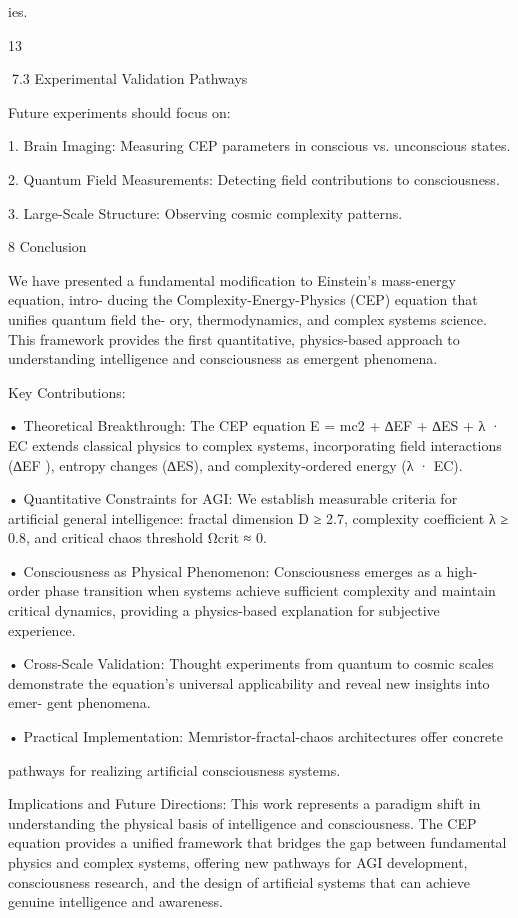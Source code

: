 ies.

13

7.3 Experimental Validation Pathways

Future experiments should focus on:

1. Brain Imaging: Measuring CEP parameters in conscious vs. unconscious states.

2. Quantum Field Measurements: Detecting field contributions to consciousness.

3. Large-Scale Structure: Observing cosmic complexity patterns.

8 Conclusion

We have presented a fundamental modification to Einstein’s mass-energy equation, intro-
ducing the Complexity-Energy-Physics (CEP) equation that unifies quantum field the-
ory, thermodynamics, and complex systems science. This framework provides the first
quantitative, physics-based approach to understanding intelligence and consciousness as
emergent phenomena.

Key Contributions:

• Theoretical Breakthrough: The CEP equation E = mc2 + ∆EF + ∆ES + λ ·
EC extends classical physics to complex systems, incorporating field interactions
(∆EF ), entropy changes (∆ES), and complexity-ordered energy (λ · EC).

• Quantitative Constraints for AGI: We establish measurable criteria for artificial
general intelligence: fractal dimension D ≥ 2.7, complexity coefficient λ ≥ 0.8, and
critical chaos threshold Ωcrit ≈ 0.

• Consciousness as Physical Phenomenon: Consciousness emerges as a high-
order phase transition when systems achieve sufficient complexity and maintain
critical dynamics, providing a physics-based explanation for subjective experience.

• Cross-Scale Validation: Thought experiments from quantum to cosmic scales
demonstrate the equation’s universal applicability and reveal new insights into emer-
gent phenomena.

• Practical Implementation: Memristor-fractal-chaos architectures offer concrete

pathways for realizing artificial consciousness systems.

Implications and Future Directions: This work represents a paradigm shift in
understanding the physical basis of intelligence and consciousness. The CEP equation
provides a unified framework that bridges the gap between fundamental physics and
complex systems, offering new pathways for AGI development, consciousness research,
and the design of artificial systems that can achieve genuine intelligence and awareness.

